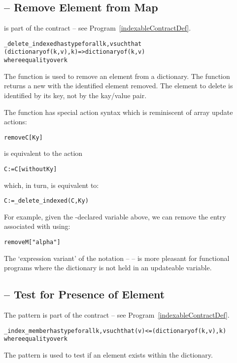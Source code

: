 \subsection{ -- Remove Element from Map}
\label{mapDeleteFunction}
 is part of the  contract -- see Program~\vref{indexableContractDef}.
\begin{alltt}
\_delete\_indexed has type for all k,v such that
                           (dictionary of (k,v),k)=>dictionary of (k,v)
                           where equality over k
\end{alltt}
The  function is used to remove an element from a dictionary. The  function returns a new  with the identified element removed. The element to delete is identified by its key, not by the kay/value pair.

The  function has special action syntax which is reminiscent of array update actions:
\begin{alltt}
remove C[Ky]
\end{alltt}
is equivalent to the action
\begin{alltt}
C := C[without Ky]
\end{alltt}
which, in turn, is equivalent to:
\begin{alltt}
C := \_delete\_indexed(C,Ky)
\end{alltt}
For example, given the -declared variable  above, we can remove the entry associated with  using:
\begin{alltt}
remove M["alpha"]
\end{alltt}

The `expression variant' of the  notation --  -- is more pleasant for functional programs where the dictionary is not held in an updateable variable.

\subsection{ -- Test for Presence of Element}
\label{mapIndexPresent}
The  pattern is part of the  contract -- see Program~\vref{indexableContractDef}.
\begin{alltt}
\_index\_member has type for all k,v such that (v)<=(dictionary of (k,v),k)
                          where equality over k
\end{alltt}
The  pattern is used to test if an element exists within the dictionary. 


